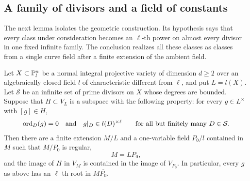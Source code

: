 \subsection{A family of divisors and a field of constants}

The next lemma isolates the geometric construction.  Its hypothesis says
that every class under consideration becomes an $\ell$-th power on almost
every divisor in one fixed infinite family.  The conclusion realizes all
these classes as classes from a single curve field after a finite extension
of the ambient field.

\begin{lemma}
\label{lem:curve-incidence}
Let $X\subset\mathbb P_l^n$ be a normal integral projective variety of dimension
$d\ge2$ over an algebraically closed field $l$ of characteristic different
from $\ell$, and put $L=l(X)$.  Let $\mathcal S$ be an infinite set of
prime divisors on $X$ whose degrees are bounded.  Suppose that
$H\subset V_L$ is a subspace with the following property: for every
$g\in L^\times$ with $[g]\in H$,
\begin{equation}
\label{eq:curve-residue-trivial}
 \operatorname{ord}_D(g)=0\quad\hbox{and}\quad
 g|_D\in l(D)^{\times\ell}
 \qquad\hbox{for all but finitely many }D\in\mathcal S.
\end{equation}
Then there are a finite extension $M/L$ and a one-variable field
$P_0/l$ contained in $M$ such that $M/P_0$ is regular,
\begin{equation}
\label{eq:curve-compositum}
                               M=LP_0,
\end{equation}
and the image of $H$ in $V_M$ is contained in the image of $V_{P_0}$.
In particular, every $g$ as above has an $\ell$-th root in
$M\overline{P_0}$.
\end{lemma}

